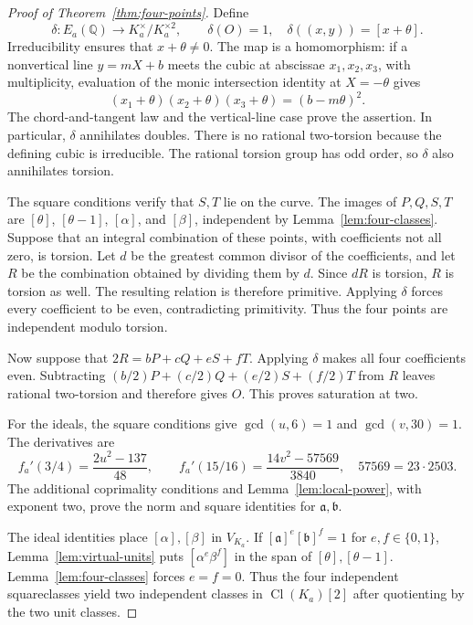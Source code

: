 \documentclass[draft]{publmathdeb}
\theoremstyle{remark}
\numberwithin{equation}{section}
\newcommand{\Q}{\mathbb Q}
\DeclareMathOperator{\Cl}{Cl}
\begin{document}
\begin{proof}[Proof of Theorem~\ref{thm:four-points}]
  Define
  \[
    \delta:E_a(\Q)\longrightarrow K_a^\times/K_a^{\times2},
    \qquad\delta(O)=1,\quad\delta((x,y))=[x+\theta].
  \]
  Irreducibility ensures that $x+\theta\ne0$. The map is a homomorphism: if a nonvertical line $y=mX+b$ meets the cubic at abscissae $x_1,x_2,x_3$, with multiplicity, evaluation of the monic intersection identity at $X=-\theta$ gives
  \[
    (x_1+\theta)(x_2+\theta)(x_3+\theta)=(b-m\theta)^2.
  \]
  The chord-and-tangent law and the vertical-line case prove the assertion. In particular, $\delta$ annihilates doubles. There is no rational two-torsion because the defining cubic is irreducible. The rational torsion group has odd order, so $\delta$ also annihilates torsion.

  The square conditions verify that $S,T$ lie on the curve. The images of $P,Q,S,T$ are $[\theta]$, $[\theta-1]$, $[\alpha]$, and $[\beta]$, independent by Lemma~\ref{lem:four-classes}. Suppose that an integral combination of these points, with coefficients not all zero, is torsion. Let $d$ be the greatest common divisor of the coefficients, and let $R$ be the combination obtained by dividing them by $d$. Since $dR$ is torsion, $R$ is torsion as well. The resulting relation is therefore primitive. Applying $\delta$ forces every coefficient to be even, contradicting primitivity. Thus the four points are independent modulo torsion.

  Now suppose that $2R=bP+cQ+eS+fT$. Applying $\delta$ makes all four coefficients even. Subtracting $(b/2)P+(c/2)Q+(e/2)S+(f/2)T$ from $R$ leaves rational two-torsion and therefore gives $O$. This proves saturation at two.

  For the ideals, the square conditions give $\gcd(u,6)=1$ and $\gcd(v,30)=1$. The derivatives are
  \[
    f_a'(3/4)=\frac{2u^2-137}{48},\qquad
    f_a'(15/16)=\frac{14v^2-57569}{3840},
    \quad 57569=23\cdot2503.
  \]
  The additional coprimality conditions and Lemma~\ref{lem:local-power}, with exponent two, prove the norm and square identities for $\mathfrak a,\mathfrak b$.

  The ideal identities place $[\alpha],[\beta]$ in $V_{K_a}$. If $[\mathfrak a]^e[\mathfrak b]^f=1$ for $e,f\in\{0,1\}$, Lemma~\ref{lem:virtual-units} puts $[\alpha^e\beta^f]$ in the span of $[\theta],[\theta-1]$. Lemma~\ref{lem:four-classes} forces $e=f=0$. Thus the four independent squareclasses yield two independent classes in $\Cl({K_a})[2]$ after quotienting by the two unit classes.
\end{proof}
\end{document}
